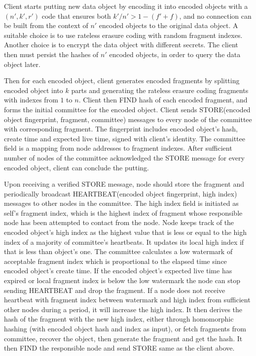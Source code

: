 Client starts putting new data object by encoding it into encoded objects with a $(n', k', r')$ code that ensures both
$k'/n' > 1-(f'+f)$, and no connection can be built from the context of $n'$ encoded objects to the original data object.
A suitable choice is to use rateless erasure coding with random fragment indexes.
Another choice is to encrypt the data object with different secrets.
The client then must persist the hashes of $n'$ encoded objects, in order to query the data object later.

Then for each encoded object, client generates encoded fragments by splitting encoded object into $k$ parts and 
generating the rateless erasure coding fragments with indexes from $1$ to $n$.
Client then FIND hash of each encoded fragment, and forms the initial committee for the encoded object.
Client sends STORE(encoded object fingerprint, fragment, committee) messages to every node of the committee with 
corresponding fragment. 
The fingerprint includes encoded object's hash, create time and expected live time, signed with client's identity.
The committee field is a mapping from node addresses to fragment indexes.
After sufficient number of nodes of the committee acknowledged the STORE message for every encoded object, client can
conclude the putting.

Upon receiving a verified STORE message, node should store the fragment and periodically broadcast 
HEARTBEAT(encoded object fingerprint, high index) messages to other nodes in the committee.
The high index field is initiated as self's fragment index, which is the highest index of fragment whose responsible 
node has been attempted to contact from the node.
Node keeps track of the encoded object's high index as the highest value that is less or equal to the high index of a
majority of committee's heartbeats.
It updates its local high index if that is less than object's one.
The committee calculates a low watermark of acceptable fragment index which is proportional to the elapsed time since
encoded object's create time.
If the encoded object's expected live time has expired or local fragment index is below the low watermark the node can
stop sending HEARTBEAT and drop the fragment.
If a node does not receive heartbeat with fragment index between watermark and high index from sufficient other nodes 
during a period, it will increase the high index. 
It then derives the hash of the fragment with the new high index, either through homomorphic hashing (with encoded 
object hash and index as input), or fetch fragments from committee, recover the object, then generate the fragment and
get the hash.
It then FIND the responsible node and send STORE same as the client above.
